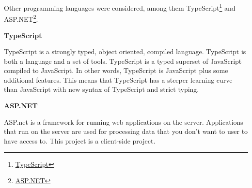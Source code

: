 Other programming languages were considered, among them TypeScript\footnote{\href{https://www.typescriptlang.org/}{TypeScript}\label{typescript}} and ASP.NET\footnote{\href{https://dotnet.microsoft.com/apps/aspnet}{ASP.NET}\label{asp.net}}.

\bigskip
\centerline{\textbf{TypeScript}}
\medskip

TypeScript is a strongly typed, object oriented, compiled language. TypeScript is both a language and a set of tools. TypeScript is a typed superset of JavaScript compiled to JavaScript. In other words, TypeScript is JavaScript plus some additional features. This means that TypeScript has a steeper learning curve than JavaScript with new syntax of TypeScript and strict typing.

\bigskip
\centerline{\textbf{ASP.NET}}
\medskip

ASP.net is a framework for running web applications on the server. Applications that run on the server are used for processing data that you don't want to user to have access to. This project is a client-side project.







